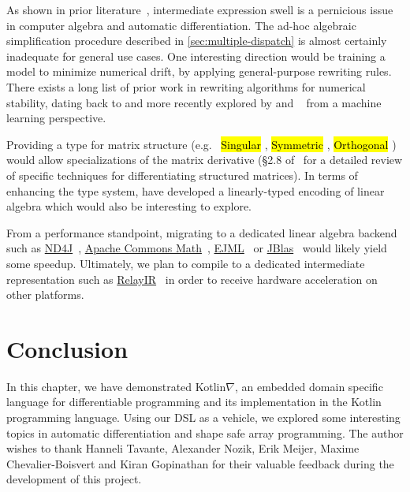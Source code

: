 \documentclass[12pt,initial,twoside,maitrise]{dms}
\newcommand{\inline}[1]{%
    \begingroup%
    \sethlcolor{slightgray}%
    \hl{\ttfamily\footnotesize #1}%
    \endgroup
}
\numberwithin{equation}{section}
\numberwithin{table}{chapter}
\numberwithin{figure}{chapter}
\begin{document}
As shown in prior literature~\citep{bergstra2010theano, baydin2015survey, laue2019equivalence}, intermediate expression swell is a pernicious issue in computer algebra and automatic differentiation. The ad-hoc algebraic simplification procedure described in \autoref{sec:multiple-dispatch} is almost certainly inadequate for general use cases. One interesting direction would be training a model to minimize numerical drift, by applying general-purpose rewriting rules. There exists a long list of prior work in rewriting algorithms for numerical stability, dating back to \citet{kahan1965summation, dekker1971floating, ogita2005accurate} and more recently explored by \citet{zaremba2014learning, zaremba2016learning} and ~\citet{wang2019global} from a machine learning perspective.

Providing a type for matrix structure (e.g.\ \inline{Singular}, \inline{Symmetric}, \inline{Orthogonal}) would allow specializations of the matrix derivative (\S 2.8 of~\citet{petersen2012matrix} for a detailed review of specific techniques for differentiating structured matrices). In terms of enhancing the type system, \citet{makwana2018numlin} have developed a linearly-typed encoding of linear algebra which would also be interesting to explore.

From a performance standpoint, migrating to a dedicated linear algebra backend such as \href{https://deeplearning4j.org/docs/latest/nd4j-overview}{ND4J}~\citep{team2016nd4j}, \href{https://commons.apache.org/proper/commons-math/}{Apache Commons Math}~\citep{developers2012apache}, \href{http://ejml.org}{EJML}~\citep{abeles2010efficient} or \href{http://jblas.org/}{JBlas}~\citep{braun2011jblas} would likely yield some speedup. Ultimately, we plan to compile to a dedicated intermediate representation such as \href{https://docs.tvm.ai/dev/relay_intro.html}{RelayIR}~\citep{roesch2018relay} in order to receive hardware acceleration on other platforms.

\section{Conclusion}

In this chapter, we have demonstrated Kotlin$\nabla$, an embedded domain specific language for differentiable programming and its implementation in the Kotlin programming language. Using our DSL as a vehicle, we explored some interesting topics in automatic differentiation and shape safe array programming. The author wishes to thank Hanneli Tavante, Alexander Nozik, Erik Meijer, Maxime Chevalier-Boisvert and Kiran Gopinathan for their valuable feedback during the development of this project.
\end{document}
